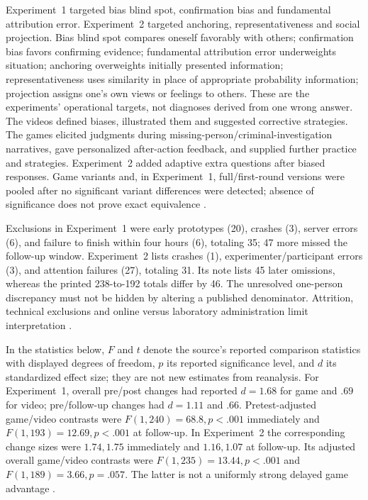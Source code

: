 Experiment~1 targeted bias blind spot, confirmation bias and fundamental
attribution error. Experiment~2 targeted anchoring, representativeness
and social projection. Bias blind spot compares oneself favorably with
others; confirmation bias favors confirming evidence; fundamental
attribution error underweights situation; anchoring overweights initially
presented information; representativeness uses similarity in place of
appropriate probability information; projection assigns one's own views
or feelings to others. These are the experiments' operational targets,
not diagnoses derived from one wrong answer. The videos defined biases,
illustrated them and
suggested corrective strategies. The games elicited judgments during
missing-person/criminal-investigation narratives, gave personalized
after-action feedback, and supplied further practice and strategies.
Experiment~2 added adaptive extra questions after biased responses.
Game variants and, in Experiment~1, full/first-round versions were pooled
after no significant variant differences were detected; absence of
significance does not prove exact equivalence
\cite[online pp.~4--8, note~2]{MorewedgeEtAl2015Debiasing}.

Exclusions in Experiment~1 were early prototypes (20), crashes (3),
server errors (6), and failure to finish within four hours (6), totaling
35; 47 more missed the follow-up window. Experiment~2 lists crashes
(1), experimenter/participant errors (3), and attention failures (27),
totaling 31. Its note lists 45 later omissions, whereas the printed
238-to-192 totals differ by 46. The unresolved one-person discrepancy
must not be hidden by altering a published denominator. Attrition,
technical exclusions and online versus laboratory administration limit
interpretation \cite[online pp.~4--6, 9--10, note~1]{MorewedgeEtAl2015Debiasing}.

In the statistics below, \(F\) and \(t\) denote the source's reported
comparison statistics with displayed degrees of freedom, \(p\) its
reported significance level, and \(d\) its standardized effect size;
they are not new estimates from reanalysis.
For Experiment~1, overall pre/post changes had reported
\(d=1.68\) for game and \(.69\) for video; pre/follow-up changes
had \(d=1.11\) and \(.66\). Pretest-adjusted game/video contrasts
were \(F(1,240)=68.8,p<.001\) immediately and
\(F(1,193)=12.69,p<.001\) at follow-up. In Experiment~2 the
corresponding change sizes were \(1.74,1.75\) immediately and
\(1.16,1.07\) at follow-up. Its adjusted overall game/video
contrasts were \(F(1,235)=13.44,p<.001\) and
\(F(1,189)=3.66,p=.057\). The latter is not a uniformly strong
delayed game advantage \cite[online pp.~6, 8]{MorewedgeEtAl2015Debiasing}.

